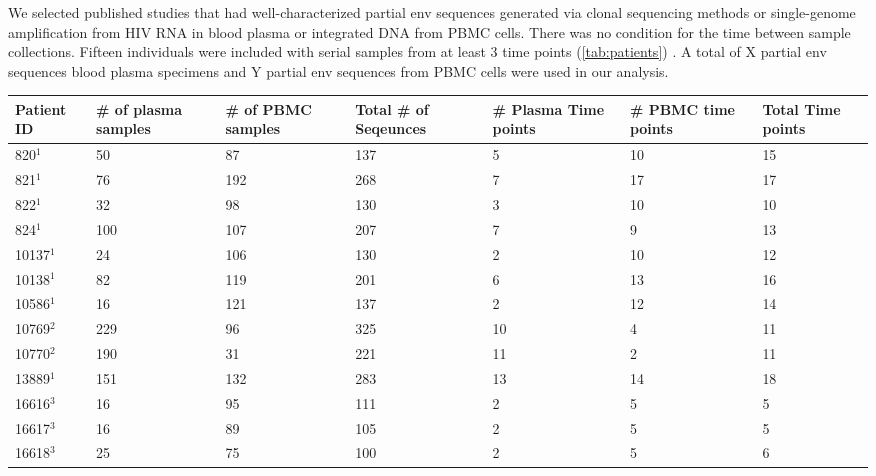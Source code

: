 We selected published studies that had well-characterized partial env sequences generated via clonal sequencing methods or single-genome amplification from HIV RNA in blood plasma or integrated DNA from PBMC cells. There was no condition for the time between sample collections. Fifteen individuals were included with serial samples from at least 3 time points (\ref{tab:patients}) . A total of X partial env sequences blood plasma specimens and Y partial env sequences from PBMC cells were used in our analysis.

\begin{table*}[!ht]\label{tab:patients} 
\def\arraystretch{1.3}%
\begin{tabularx}{\textwidth}{ X | X | X | X | X | X | X } 
\hline
\hline
Patient ID & \# of plasma samples & \# of PBMC samples & Total \# of Seqeunces & \# Plasma Time points & \# PBMC time points & Total Time points   \\ \hline \hline
820$^1$ &       50 &       87 &      137 &        5 &       10 &       15  \\
821$^1$ &       76 &      192 &      268 &        7 &       17 &       17   \\ 
822$^1$ &       32 &       98 &      130 &        3 &       10 &       10   \\ 
824$^1$ &      100 &      107 &      207 &        7 &        9 &       13   \\ 
10137$^1$ &       24 &      106 &      130 &        2 &       10 &       12  \\ 
10138$^1$ &       82 &      119 &      201 &        6 &       13 &       16  \\
10586$^1$ &       16 &      121 &      137 &        2 &       12 &       14  \\ 
10769$^2$ &      229 &       96 &      325 &       10 &        4 &       11  \\ 
10770$^2$ &      190 &       31 &      221 &       11 &        2 &       11  \\ 
13889$^1$ &      151 &      132 &      283 &       13 &       14 &       18  \\ 
16616$^3$ &       16 &       95 &      111 &        2 &        5 &        5  \\ 
16617$^3$ &       16 &       89 &      105 &        2 &        5 &        5  \\ 
16618$^3$ &       25 &       75 &      100 &        2 &        5 &        6  \\ 

\end{tabularx}
\end{table*}
